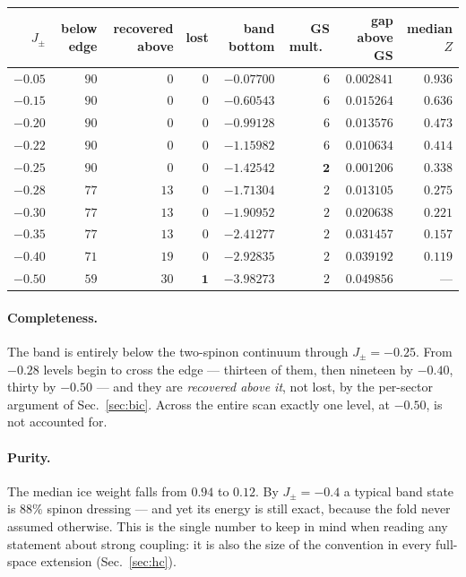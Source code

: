 \documentclass[11pt,a4paper]{article}
\newcommand{\Jpm}{J_{\pm}}
\begin{document}
\begin{center}
\small
\begin{tabular}{rrrrrrrr}
\toprule
$\Jpm$ & below edge & recovered above & lost & band bottom & GS mult.\ &
gap above GS & median $Z$\\
\midrule
$-0.05$ & $90$ & $0$ & $0$ & $-0.07700$ & $6$ & $0.002841$ & $0.936$\\
$-0.15$ & $90$ & $0$ & $0$ & $-0.60543$ & $6$ & $0.015264$ & $0.636$\\
$-0.20$ & $90$ & $0$ & $0$ & $-0.99128$ & $6$ & $0.013576$ & $0.473$\\
$-0.22$ & $90$ & $0$ & $0$ & $-1.15982$ & $6$ & $0.010634$ & $0.414$\\
$-0.25$ & $90$ & $0$ & $0$ & $-1.42542$ & $\mathbf{2}$ & $0.001206$ & $0.338$\\
$-0.28$ & $77$ & $13$ & $0$ & $-1.71304$ & $2$ & $0.013105$ & $0.275$\\
$-0.30$ & $77$ & $13$ & $0$ & $-1.90952$ & $2$ & $0.020638$ & $0.221$\\
$-0.35$ & $77$ & $13$ & $0$ & $-2.41277$ & $2$ & $0.031457$ & $0.157$\\
$-0.40$ & $71$ & $19$ & $0$ & $-2.92835$ & $2$ & $0.039192$ & $0.119$\\
$-0.50$ & $59$ & $30$ & $\mathbf{1}$ & $-3.98273$ & $2$ & $0.049856$ & ---\\
\bottomrule
\end{tabular}
\end{center}

\paragraph{Completeness.}  The band is entirely below the two-spinon
continuum through $\Jpm=-0.25$.  From $-0.28$ levels begin to cross the
edge --- thirteen of them, then nineteen by $-0.40$, thirty by $-0.50$ ---
and they are \emph{recovered above it}, not lost, by the per-sector argument
of Sec.~\ref{sec:bic}.  Across the entire scan exactly one level, at
$-0.50$, is not accounted for.

\paragraph{Purity.}  The median ice weight falls from $0.94$ to $0.12$.  By
$\Jpm=-0.4$ a typical band state is $88\%$ spinon dressing --- and yet its
energy is still exact, because the fold never assumed otherwise.  This is
the single number to keep in mind when reading any statement about strong
coupling: it is also the size of the convention in every full-space
extension (Sec.~\ref{sec:hc}).
\end{document}
